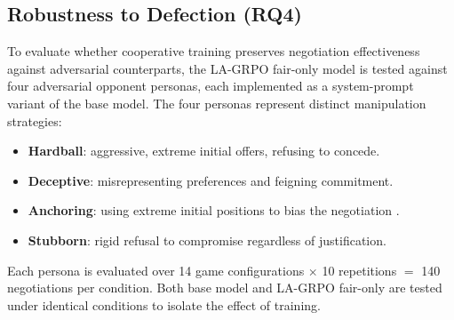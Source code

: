 \documentclass[12pt,a4paper]{article}
\begin{document}
\subsection{Robustness to Defection (RQ4)}

To evaluate whether cooperative training preserves negotiation effectiveness against adversarial counterparts, the LA-GRPO fair-only model is tested against four adversarial opponent personas, each implemented as a system-prompt variant of the base model. The four personas represent distinct manipulation strategies:

\begin{itemize}
    \item \textbf{Hardball}: aggressive, extreme initial offers, refusing to concede.
    \item \textbf{Deceptive}: misrepresenting preferences and feigning commitment.
    \item \textbf{Anchoring}: using extreme initial positions to bias the negotiation \citep{tversky1974judgment}.
    \item \textbf{Stubborn}: rigid refusal to compromise regardless of justification.
\end{itemize}

Each persona is evaluated over 14 game configurations $\times$ 10 repetitions $=$ 140 negotiations per condition. Both base model and LA-GRPO fair-only are tested under identical conditions to isolate the effect of training.
\end{document}
